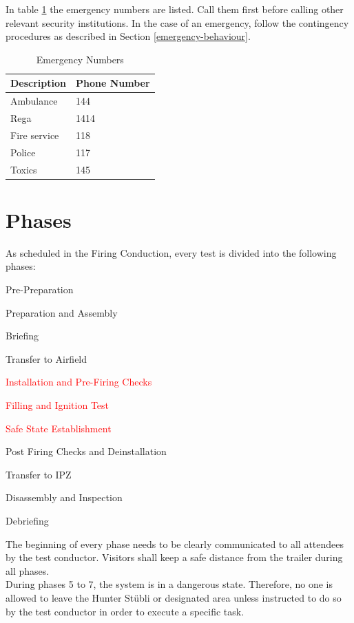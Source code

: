\documentclass{article}
\begin{document}
In table \ref{tab:emergency-numbers} the emergency numbers are listed. Call them first before calling other relevant security institutions. In the case of an emergency, follow the contingency procedures as described in Section \ref{emergency-behaviour}.
\begin{table}[h]
    \caption{Emergency Numbers}
    \label{tab:emergency-numbers}
    \begin{tabularx}{0.9\textwidth}{|X|X|}
        \hline
        \rowcolor{tableHeaderColor} \textbf{Description} & \textbf{Phone Number} \\ \hline
        Ambulance & 144 \\ \hline
        Rega & 1414 \\ \hline
        Fire service & 118 \\ \hline
        Police & 117 \\ \hline
        Toxics & 145 \\ \hline
    \end{tabularx}
\end{table}
\section{Phases}
As scheduled in the Firing Conduction, every test is divided into the following phases:
\begin{enumerate}
    \item Pre-Preparation
    \item Preparation and Assembly
    \item Briefing
    \item Transfer to Airfield
    \textcolor{red}{
    \item Installation and Pre-Firing Checks
    \item Filling and Ignition Test
    \item Safe State Establishment}
    \item Post Firing Checks and Deinstallation
    \item Transfer to IPZ
    \item Disassembly and Inspection
    \item Debriefing
\end{enumerate}
The beginning of every phase needs to be clearly communicated to all attendees by the test conductor. Visitors shall keep a safe distance from the trailer during all phases. \\
\noindent
During phases 5 to 7, the system is in a dangerous state. Therefore, no one is allowed to leave the Hunter Stübli or designated area unless instructed to do so by the test conductor in order to execute a specific task.
\end{document}
